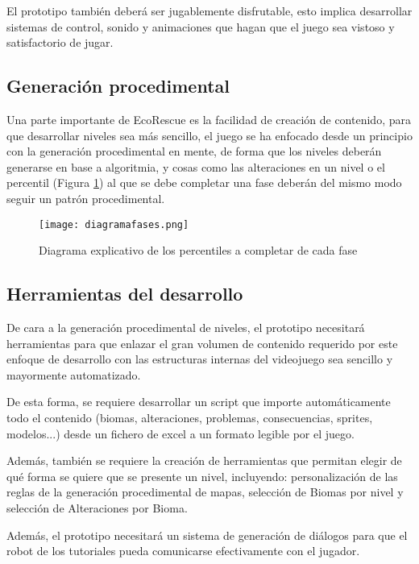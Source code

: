 El prototipo también deberá ser jugablemente disfrutable, esto implica desarrollar sistemas de control, sonido y animaciones que hagan que el juego sea vistoso y satisfactorio de jugar.

\subsection{Generación procedimental}

Una parte importante de EcoRescue es la facilidad de creación de contenido, para que desarrollar niveles sea más sencillo, el juego se ha enfocado desde un principio con la generación procedimental en mente, de forma que los niveles deberán generarse en base a algoritmia\cite{FastNoiseLite}, y cosas como las alteraciones en un nivel o el percentil (Figura \ref{fig:percentil}) al que se debe completar una fase deberán del mismo modo seguir un patrón procedimental.

\begin{figure}[H]
  \centering
    \texttt{[image: diagramafases.png]}
  \caption{Diagrama explicativo de los percentiles a completar de cada fase}
  \label{fig:percentil}
\end{figure}

\subsection{Herramientas del desarrollo}

De cara a la generación procedimental de niveles, el prototipo necesitará herramientas para que enlazar el gran volumen de contenido requerido por este enfoque de desarrollo con las estructuras internas del videojuego sea sencillo y mayormente automatizado. 

De esta forma, se requiere desarrollar un script que importe automáticamente todo el contenido (biomas, alteraciones, problemas, consecuencias, sprites, modelos...) desde un fichero de excel a un formato legible por el juego.

Además, también se requiere la creación de herramientas que permitan elegir de qué forma se quiere que se presente un nivel, incluyendo: personalización de las reglas de la generación procedimental de mapas, selección de Biomas por nivel y selección de Alteraciones por Bioma.

Además, el prototipo necesitará un sistema de generación de diálogos para que el robot de los tutoriales pueda comunicarse efectivamente con el jugador.

